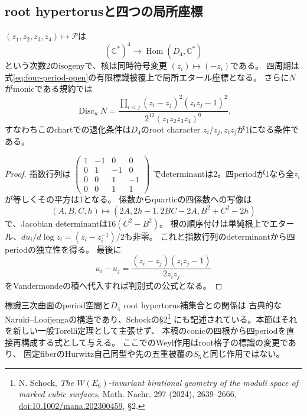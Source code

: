 \subsection{root hypertorusと四つの局所座標}
\begin{corollary}
\label{cor:conic-period-torus}
$(z_1,z_2,z_3,z_4)\mapsto\mathcal P$は
\[
 (\mathbb C^*)^4\longrightarrow\operatorname{Hom}(D_4,\mathbb C^*)
\]
という次数2のisogenyで、核は同時符号変更
$(z_i)\mapsto(-z_i)$である。
四周期は式\eqref{eq:four-period-open}の有限標識被覆上で局所エタール座標となる。
さらに$N$がmonicである規約では
\begin{equation}\label{eq:conic-D4-discriminant}
 \operatorname{Disc}_uN
 =\frac{\prod_{i<j}(z_i-z_j)^2(z_iz_j-1)^2}
 {2^{12}(z_1z_2z_3z_4)^6}.
\end{equation}
すなわちこのchartでの退化条件は$D_4$のroot character
$z_i/z_j,z_iz_j$が1になる条件である。
\end{corollary}
\begin{proof}
指数行列は
$\left(\begin{smallmatrix}1&-1&0&0\\0&1&-1&0\\0&0&1&-1\\0&0&1&1\end{smallmatrix}\right)$
でdeterminantは2。四periodが1なら全$z_i$が等しくその平方は1となる。
係数からquarticの四係数への写像は
\[
 (A,B,C,h)\longmapsto(2A,2h-1,2BC-2A,B^2+C^2-2h)
\]
で、Jacobian determinantは$16(C^2-B^2)$。
根の順序付けは単純根上でエタール、$du_i/d\log z_i=(z_i-z_i^{-1})/2$も非零。
これと指数行列のdeterminantから四periodの独立性を得る。
最後に
\[
 u_i-u_j=\frac{(z_i-z_j)(z_iz_j-1)}{2z_iz_j}
\]
をVandermondeの積へ代入すれば判別式の公式となる。
\end{proof}

標識三次曲面のperiod空間と$D_4$ root hypertorus補集合との関係は
古典的なNaruki--Looijengaの構造であり、Schockの\S2\footnote{
N. Schock, \emph{The $W(E_6)$-invariant birational geometry of the moduli space of marked cubic surfaces},
Math. Nachr. 297 (2024), 2639--2666,
\href{https://doi.org/10.1002/mana.202300459}{doi:10.1002/mana.202300459}, \S2.}
にも記述されている。本節はそれを新しい一般Torelli定理として主張せず、
本稿のconicの四根から四periodを直接再構成する式として与える。
ここでのWeyl作用はroot格子の標識の変更であり、
固定fiberのHurwitz自己同型や先の五重被覆の$S_5$と同じ作用ではない。

